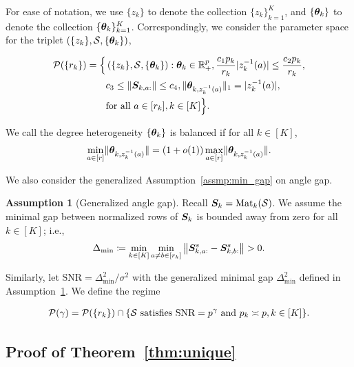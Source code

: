 \documentclass[journal]{IEEEtran}
\theoremstyle{definition}
\theoremstyle{definition}
\newtheorem{assumption}{Assumption}
\newcommand{\of}[1]{\left(#1\right)}
\begin{document}
For ease of notation, we use $\{z_k\}$ to denote the collection $\{z_k\}_{k=1}^K$, and $\{\boldsymbol{\theta}_k\}$ to denote the collection $\{\boldsymbol{\theta}_k\}_{k=1}^K$. Correspondingly, we consider the parameter space for the triplet $\of{\{z_k\}, \tS, \{\mtheta_k\}}$,

\vspace{-1cm}
\small
\begin{align}
  \tP(\{r_k\}) = \Big\{ &\of{\{z_k\}, \tS, \{\mtheta_k\}}: \mtheta_k \in\mathbb{R}^p_{+}, {c_1 p_k\over r_k} |z_k^{-1}(a)| \leq {c_2 p_k\over r_k}, \\ & c_3 \leq  \onorm{\mS_{k,a:}} \leq c_4 ,\onormSize{}{\mtheta_{k,z_k^{-1}(a)}}_1=|z_k^{-1}(a)|,\\
  & \text{for all }a \in [r_k], k\in[K]\Big\}. \label{eq:general_family}
\end{align}
\normalsize


We call the degree heterogeneity $\{\boldsymbol{\theta}_k\}$ is balanced if for all $k \in [K]$,
\begin{equation}\label{eq:general_balanced}
    {\min_{a\in[r]} \onormSize{}{\mtheta_{k, z_k^{-1}(a)}}=\left(1+o(1)\right)\max_{a\in[r]}\onormSize{}{\mtheta_{k,z_k^{-1}(a)}}}.
\end{equation}


We also consider the generalized Assumption~\ref{assmp:min_gap} on angle gap.
\begin{assumption}[Generalized angle gap]\label{assmp:general_minimal_gap} Recall $\bm S_k=\text{Mat}_k(\mathcal{S})$. We assume the minimal gap between normalized rows of $\bm S_k$ is bounded away from zero for all $k\in[K]$; i.e.,
\begin{equation}
     \Delta_{\min} \coloneqq \min_{k \in [K]} \min_{a \neq b \in [r_k]} \left\lVert \bm S_{k,a:}^s - \bm S_{k, b:}^s \right\rVert > 0.
\end{equation}
\end{assumption}
Similarly, let $\text{SNR} = \Delta_{\min}^2/\sigma^2$ with the generalized minimal gap $\Delta_{\min}^2$ defined in Assumption~\ref{assmp:general_minimal_gap}. We define the regime

\vspace{-0.5cm}
\small
\begin{align}
    \mathcal{P}(\gamma) = \mathcal{P} (\{r_k\}) \cap\{\mathcal{S} \text{ satisfies $\text{SNR} = p^{\gamma}$ and $p_k \asymp p, k \in [K]$} \}.
\end{align}
\normalsize

\subsection{Proof of Theorem~\ref{thm:unique}}
\end{document}
